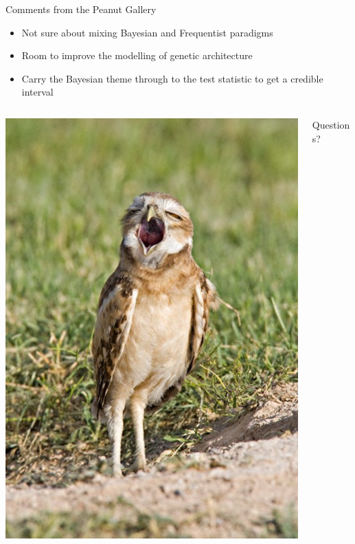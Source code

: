 \documentclass[aspectratio=169]{beamer}\usepackage[]{graphicx}\usepackage[]{color}
\begin{document}
\begin{frame}{Comments from the Peanut Gallery}
\begin{itemize}
\item Not sure about mixing Bayesian and Frequentist paradigms
\bigskip
\item Room to improve the modelling of genetic architecture
\bigskip
\item Carry the Bayesian theme through to the test statistic to get a credible interval
\end{itemize}
\end{frame}

\begin{frame}
\begin{columns}[onlytextwidth]
\begin{column}{0.5\textwidth}
\includegraphics[scale=.6]{./figure/YawningOwl.jpg}
\end{column}
\begin{column}{0.5\textwidth}
\huge Questions?
\end{column}
\end{columns}
\end{frame}
\end{document}

